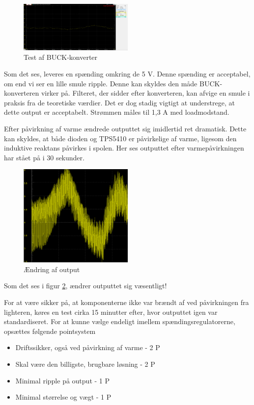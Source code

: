 \begin{figure}[h]
  \centering
  \includegraphics[width=0.5\textwidth]{./figurer/j10.png}
  \caption{Test af BUCK-konverter}
  \label{fig:j10}
\end{figure}

Som det ses, leveres en spænding omkring de 5 V. Denne spænding er acceptabel, om end vi ser en lille smule ripple. Denne kan skyldes den måde BUCK-konverteren virker på. Filteret, der sidder efter konverteren, kan afvige en smule i praksis fra de teoretiske værdier. Det er dog stadig vigtigt at understrege, at dette output er acceptabelt. Strømmen måles til 1,3 A med loadmodstand.

Efter påvirkning af varme ændrede outputtet sig imidlertid ret dramatisk. Dette kan skyldes, at både dioden og TPS5410 er påvirkelige af varme, ligesom den induktive reaktans påvirkes i spolen. Her ses outputtet efter varmepåvirkningen har stået på i 30 sekunder. 

\begin{figure}[h]
  \centering
  \includegraphics[width=0.5\textwidth]{./figurer/j11.png}
  \caption{Ændring af output}
  \label{fig:j11}
\end{figure}


Som det ses i figur \ref{fig:j11}, ændrer outputtet sig væsentligt! 

For at være sikker på, at komponenterne ikke var brændt af ved påvirkningen fra lighteren, køres en test cirka 15 minutter efter, hvor outputtet igen var standardiseret. 
\vspace{0.3cm}
For at kunne vælge endeligt imellem spændingsregulatorerne, opsættes følgende pointsystem
\begin{itemize}
\item Driftssikker, også ved påvirkning af varme - 2 P
\item Skal være den billigste, brugbare løsning - 2 P
\item Minimal ripple på output - 1 P
\item Minimal størrelse og vægt - 1 P
\end{itemize}

